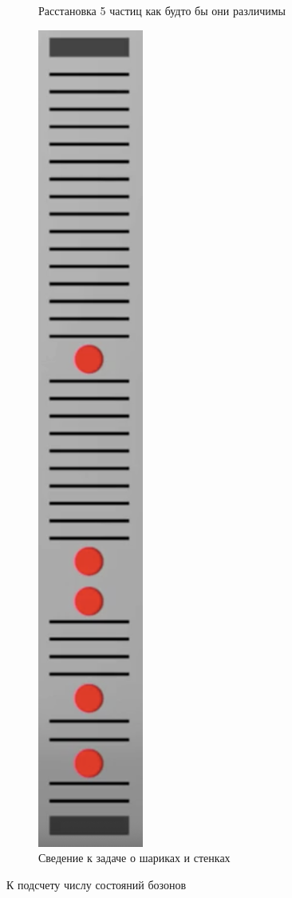 \begin{figure}[ht]
\begin{subfigure}{0.33\columnwidth}
        \caption{Расстановка 5 частиц как будто бы они различимы}
        \label{fig:putting-particles}
    \end{subfigure}
    \begin{subfigure}{0.33\columnwidth}
        \includegraphics[width=0.8\linewidth, height=2\linewidth]{fig/balls-walls}
        \caption{Сведение к задаче о шариках и стенках}
        \label{fig:balls-walls}
    \end{subfigure}
    \caption{К подсчету числу состояний бозонов}
\end{figure}

